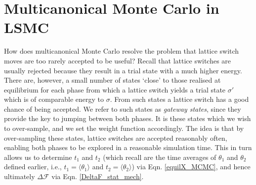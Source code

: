 \documentclass{report}
\begin{document}
\section{Multicanonical Monte Carlo in LSMC}\label{sec:multicanonical_LSMC}
How does multicanonical Monte Carlo resolve the problem that lattice switch moves are too rarely accepted to be useful? Recall that lattice switches
are usually rejected because they result in a trial state with a much higher energy.
There are, however, a small number of states `close' to those realised at equilibrium for each phase from which a lattice switch yields a 
trial state $\sigma'$ which is of comparable energy to $\sigma$. From such states a lattice switch has a good chance of being accepted.
We refer to such states as \emph{gateway states}, since they provide the key to jumping between both phases. It is these states which we wish to over-sample,
and we set the weight function accordingly. The idea is that by over-sampling these states, lattice switches are accepted reasonably often, 
enabling both phases to be explored in a reasonable simulation time. This in turn allows us to determine $t_1$ and $t_2$ (which recall are the time
averages of $\theta_1$ and $\theta_2$ defined earlier, i.e., $t_1=\langle\theta_1\rangle$ and $t_2=\langle\theta_2\rangle$) via Eqn. \eqref{equilX_MCMC},
and hence ultimately $\Delta \mathcal{F}$ via Eqn. \eqref{DeltaF_stat_mech}.
\end{document}
